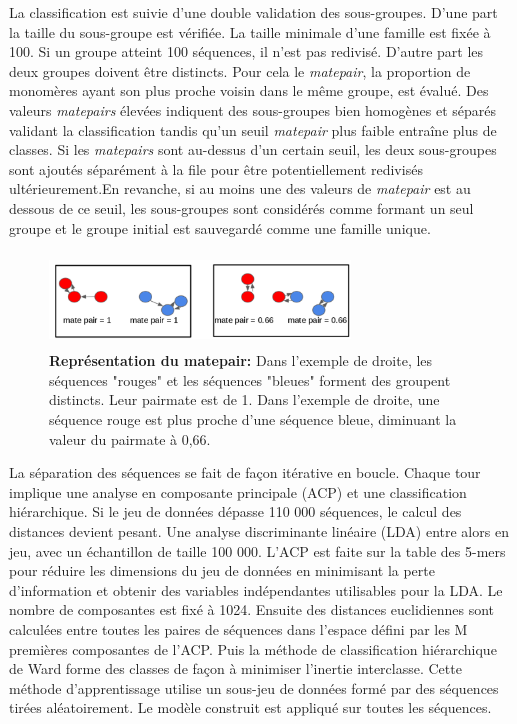 \documentclass[12pt,a4paper]{article}
\begin{document}
La classification est suivie d'une double validation des sous-groupes. D'une part la taille du sous-groupe est vérifiée. La taille minimale d'une famille est fixée à 100. Si un groupe atteint 100 séquences, il n'est pas redivisé. D'autre part les deux groupes doivent être distincts. Pour cela le \textit{matepair}, la proportion de monomères ayant son plus proche voisin dans le même groupe, est évalué. Des valeurs \textit{matepairs} élevées indiquent des sous-groupes bien homogènes et séparés validant la classification tandis qu’un seuil \textit{matepair} plus faible entraîne plus de classes. Si les \textit{matepairs} sont au-dessus d’un certain seuil, les deux sous-groupes sont ajoutés séparément à la file pour être potentiellement redivisés ultérieurement.En revanche, si au moins une des valeurs de \textit{matepair} est au dessous de ce seuil, les sous-groupes sont considérés comme formant un seul groupe et le groupe initial est sauvegardé comme une famille unique. 
	\begin{figure}
		\center
		\includegraphics[height=2.5cm, width=8cm]{img/matepair.png}
		\caption{\textbf{Représentation du matepair:} Dans l'exemple de droite, les séquences "rouges" et les séquences "bleues" forment des groupent distincts. Leur pairmate est de 1. Dans l'exemple de droite, une séquence rouge est plus proche d'une séquence bleue, diminuant la valeur du pairmate à 0,66.}
	\end{figure}

La séparation des séquences se fait de façon itérative en boucle. Chaque tour implique une analyse en composante principale (ACP) et une classification hiérarchique. Si le jeu de données dépasse 110 000 séquences, le calcul des distances devient pesant. Une analyse discriminante linéaire (LDA) entre alors en jeu, avec un échantillon de taille 100 000. L'ACP est faite sur la table des 5-mers pour réduire les dimensions du jeu de données en minimisant la perte d'information et obtenir des variables indépendantes utilisables pour la LDA. Le nombre de composantes est fixé à 1024. Ensuite des distances euclidiennes sont calculées entre toutes les paires de séquences dans l’espace défini par les M premières composantes de l’ACP. Puis la méthode de classification hiérarchique de Ward forme des classes de façon à minimiser l’inertie interclasse. Cette méthode d'apprentissage utilise un sous-jeu de données formé par des séquences tirées aléatoirement. Le modèle construit est appliqué sur toutes les séquences.
\end{document}
